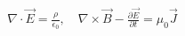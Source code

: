 \documentclass[preview]{standalone}
\begin{document}
\begin{align*}
\nabla \cdot \vec{E} = \frac{\rho}{\epsilon_0} ,\quad \nabla \times \vec{B} - \frac{\partial \vec{E}}{\partial t} = \mu_0 \vec{J}
\end{align*}
\end{document}
